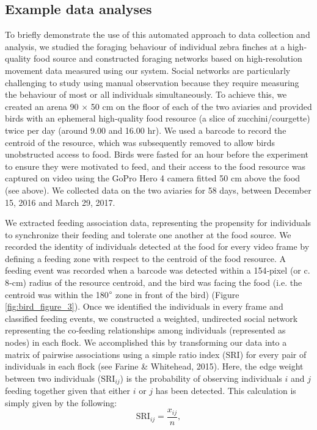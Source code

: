 \documentclass[11pt,a4paper,twoside]{book}
\begin{document}
\begin{doublespace}
\subsection{Example data analyses}
To briefly demonstrate the use of this automated approach to data collection and analysis, we studied the foraging behaviour of individual zebra finches at a high‐quality food source and constructed foraging networks based on high‐resolution movement data measured using our system. Social networks are particularly challenging to study using manual observation because they require measuring the behaviour of most or all individuals simultaneously. To achieve this, we created an arena 90 $\times$ 50 cm on the floor of each of the two aviaries and provided birds with an ephemeral high‐quality food resource (a slice of zucchini/courgette) twice per day (around 9.00 and 16.00 hr). We used a barcode to record the centroid of the resource, which was subsequently removed to allow birds unobstructed access to food. Birds were fasted for an hour before the experiment to ensure they were motivated to feed, and their access to the food resource was captured on video using the GoPro Hero 4 camera fitted 50 cm above the food (see above). We collected data on the two aviaries for 58 days, between December 15, 2016 and March 29, 2017.

We extracted feeding association data, representing the propensity for individuals to synchronize their feeding and tolerate one another at the food source. We recorded the identity of individuals detected at the food for every video frame by defining a feeding zone with respect to the centroid of the food resource. A feeding event was recorded when a barcode was detected within a 154‐pixel (or c. 8‐cm) radius of the resource centroid, and the bird was facing the food (i.e. the centroid was within the 180$\degree$ zone in front of the bird) (Figure \ref{fig:bird_figure_3}). Once we identified the individuals in every frame and classified feeding events, we constructed a weighted, undirected social network representing the co‐feeding relationships among individuals (represented as nodes) in each flock. We accomplished this by transforming our data into a matrix of pairwise associations using a simple ratio index ($\mathrm{SRI}$) for every pair of individuals in each flock (see Farine & Whitehead, 2015). Here, the edge weight between two individuals ($\mathrm{SRI}_{ij}$) is the probability of observing individuals $i$ and $j$ feeding together given that either $i$ or $j$ has been detected. This calculation is simply given by the following:
\begin{equation}
    \mathrm{SRI}_{ij} = \frac{x_{ij}}{n},
\end{equation}


\end{doublespace}
\end{document}
